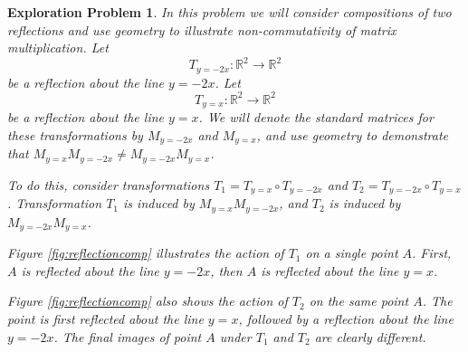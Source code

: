 \documentclass{ximera}
\newcommand{\RR}{\mathbb{R}}
\newtheorem{initprob}{Exploration Problem}
\begin{document}
\begin{initprob}\label{init:reflectioncomp}  In this problem we will consider compositions of two reflections and use geometry to illustrate non-commutativity of matrix multiplication.  
Let $$T_{y=-2x}:\RR^2\rightarrow \RR^2$$ be a reflection about the line $y=-2x$.  Let $$T_{y=x}:\RR^2\rightarrow \RR^2$$ be a reflection about the line $y=x$. We will denote the standard matrices for these transformations by $M_{y=-2x}$ and $M_{y=x}$, and
 use geometry to demonstrate that $M_{y=x}M_{y=-2x}\neq M_{y=-2x}M_{y=x}$.  
 
 To do this, consider transformations $T_1=T_{y=x}\circ T_{y=-2x}$ and $T_2=T_{y=-2x}\circ T_{y=x}$.  Transformation $T_1$ is induced by $M_{y=x}M_{y=-2x}$, and $T_2$ is induced by $M_{y=-2x}M_{y=x}$.

Figure \ref{fig:reflectioncomp} illustrates the action of $T_1$ on a single point $A$.  First, $A$ is reflected about the line $y=-2x$, then $A$ is reflected about the line $y=x$.   

Figure \ref{fig:reflectioncomp} also shows the action of $T_2$ on the same point $A$.  The point is first reflected about the line $y=x$, followed by a reflection about the line $y=-2x$.  The final images of point $A$ under $T_1$ and $T_2$ are clearly different.

\begin{figure}[h]
\centering    
{}
  \quad\quad
\begin{tikzpicture}[scale=.3]
 

\end{tikzpicture}
\end{figure}
\end{initprob}
\end{document}
